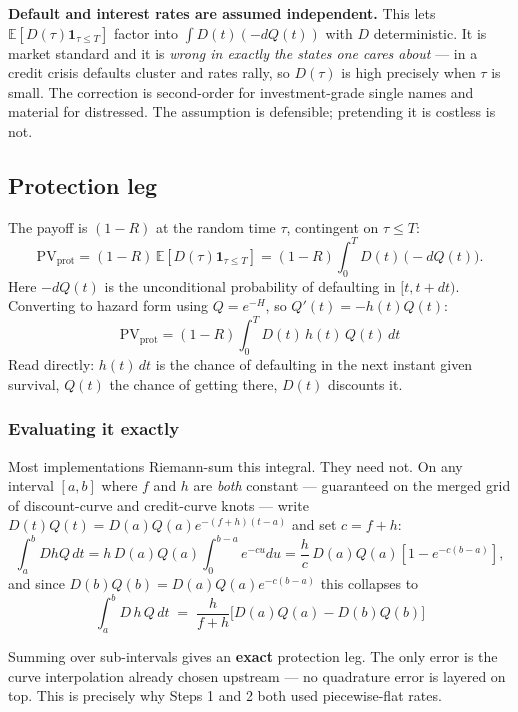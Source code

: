 \documentclass[11pt,a4paper]{article}
\newcommand{\keypoint}[1]{%
  \par\vspace{0.4em}\noindent
  \colorbox{codebg}{\parbox{\dimexpr\linewidth-2\fboxsep}{\small #1}}%
  \par\vspace{0.5em}}
\begin{document}
\keypoint{\textbf{Default and interest rates are assumed independent.} This lets
$\mathbb{E}[D(\tau)\mathbf{1}_{\tau \le T}]$ factor into $\int D(t)(-dQ(t))$ with $D$
deterministic. It is market standard and it is \emph{wrong in exactly the states one cares
about} --- in a credit crisis defaults cluster and rates rally, so $D(\tau)$ is high
precisely when $\tau$ is small. The correction is second-order for investment-grade single
names and material for distressed. The assumption is defensible; pretending it is costless
is not.}

\subsection{Protection leg}

The payoff is $(1-R)$ at the random time $\tau$, contingent on $\tau \le T$:
\[
\text{PV}_{\text{prot}}
= (1-R)\,\mathbb{E}\!\left[D(\tau)\mathbf{1}_{\tau\le T}\right]
= (1-R)\int_0^T D(t)\,\big(-dQ(t)\big).
\]
Here $-dQ(t)$ is the unconditional probability of defaulting in $[t, t+dt)$. Converting to
hazard form using $Q = e^{-H}$, so $Q'(t) = -h(t)Q(t)$:
\begin{equation}
\boxed{\;\text{PV}_{\text{prot}} = (1-R)\int_0^T D(t)\,h(t)\,Q(t)\,dt\;}
\end{equation}
Read directly: $h(t)\,dt$ is the chance of defaulting in the next instant given survival,
$Q(t)$ the chance of getting there, $D(t)$ discounts it.

\subsubsection*{Evaluating it exactly}

Most implementations Riemann-sum this integral. They need not. On any interval $[a,b]$ where
$f$ and $h$ are \emph{both} constant --- guaranteed on the merged grid of discount-curve and
credit-curve knots --- write $D(t)Q(t) = D(a)Q(a)e^{-(f+h)(t-a)}$ and set $c = f+h$:
\[
\int_a^b D h Q\,dt
= h\,D(a)Q(a)\!\int_0^{b-a}\!\!e^{-cu}du
= \frac{h}{c}\,D(a)Q(a)\left[1 - e^{-c(b-a)}\right],
\]
and since $D(b)Q(b) = D(a)Q(a)e^{-c(b-a)}$ this collapses to
\begin{equation}
\boxed{\;\int_a^b D\,h\,Q\,dt \;=\; \frac{h}{f+h}\Big[D(a)Q(a) - D(b)Q(b)\Big]\;}
\end{equation}

\keypoint{Summing over sub-intervals gives an \textbf{exact} protection leg. The only error
is the curve interpolation already chosen upstream --- no quadrature error is layered on top.
This is precisely why Steps 1 and 2 both used piecewise-flat rates.}
\end{document}
